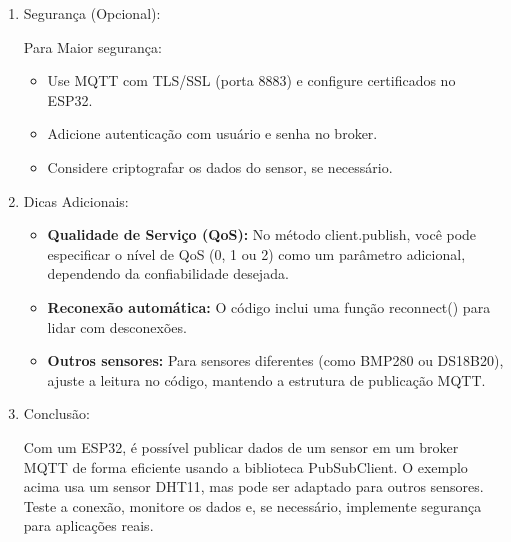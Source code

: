 \documentclass[a4paper]{article}
\begin{document}
\begin{answer}
\begin{enumerate}
            \item Segurança (Opcional):
            
            Para Maior segurança:
            \begin{itemize}
                \item Use MQTT com TLS/SSL (porta 8883) e configure certificados no ESP32.
                \item Adicione autenticação com usuário e senha no broker.
                \item Considere criptografar os dados do sensor, se necessário.
            \end{itemize}

            \item Dicas Adicionais:
            \begin{itemize}
                \item \textbf{Qualidade de Serviço (QoS):} No método client.publish, você pode especificar o nível de QoS (0, 1 ou 2) como um parâmetro adicional, dependendo da confiabilidade desejada.
                \item \textbf{Reconexão automática:} O código inclui uma função reconnect() para lidar com desconexões.
                \item \textbf{Outros sensores:} Para sensores diferentes (como BMP280 ou DS18B20), ajuste a leitura no código, mantendo a estrutura de publicação MQTT.
            \end{itemize}

            \item Conclusão:
            
            Com um ESP32, é possível publicar dados de um sensor em um broker MQTT de forma eficiente usando a biblioteca PubSubClient. O exemplo acima usa um sensor DHT11, mas pode ser adaptado para outros sensores. Teste a conexão, monitore os dados e, se necessário, implemente segurança para aplicações reais. 
                \end{enumerate}
    \end{answer}
\end{document}
